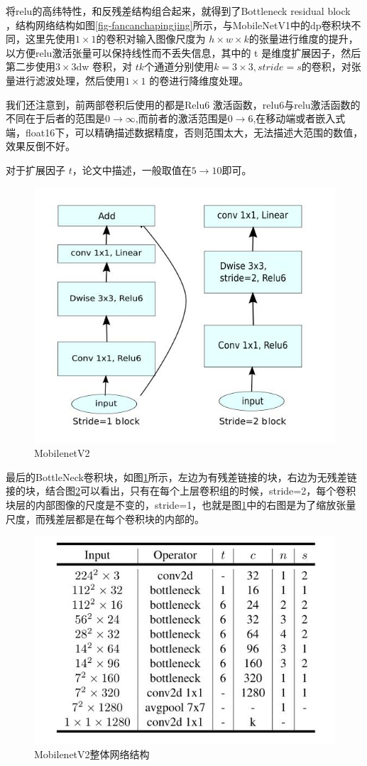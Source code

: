 \documentclass[UTF8,a4paper,12pt]{ctexart}
\begin{document}
 将relu的高纬特性，和反残差结构组合起来，就得到了Bottleneck residual block ，结构网络结构如图\ref{fig-fancanchapingjing}所示，与MobileNetV1中的dp卷积块不同，这里先使用$1\times1 $的卷积对输入图像尺度为 $ h \times w \times k$的张量进行维度的提升，以方便relu激活张量可以保持线性而不丢失信息，其中的 t 是维度扩展因子，然后第二步使用$3 \times 3$dw 卷积，对 $tk$个通道分别使用$k=3 \times 3, stride=s $的卷积，对张量进行滤波处理，然后使用$1 \times 1$ 的卷进行降维度处理。
 
我们还注意到，前两部卷积后使用的都是Relu6 激活函数，relu6与relu激活函数的不同在于后者的范围是$ 0 \to \infty$,而前者的激活范围是$0 \to 6$,在移动端或者嵌入式端，float16下，可以精确描述数据精度，否则范围太大，无法描述大范围的数值，效果反倒不好。

对于扩展因子 $t$，论文中描述，一般取值在$5 \to 10$即可。

  \begin{figure}[htbp]
 	\centering
 	\includegraphics[width=0.5\linewidth]{webmin/mobnet.jpg}
 	\caption{MobilenetV2}
 	\label{fig-mobnet}
 \end{figure}
 
 最后的BottleNeck卷积块，如图\ref{fig-mobnet}所示，左边为有残差链接的块，右边为无残差链接的块，结合图\ref{fig-mobnetjiegou}可以看出，只有在每个上层卷积组的时候，stride=2，每个卷积块层的内部图像的尺度是不变的，stride=1，也就是图\ref{fig-mobnet}中的右图是为了缩放张量尺度，而残差层都是在每个卷积块的内部的。
 

 
  \begin{figure}[htbp]
 	\centering
 	\includegraphics[width=0.5\linewidth]{webmin/v2架构图.jpg}
 	\caption{MobilenetV2整体网络结构}
 	\label{fig-mobnetjiegou}
 \end{figure}
 
\end{document}
